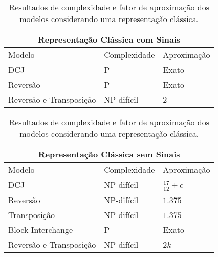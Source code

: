 \begin{table}[!htb]
  \caption{Resultados de complexidade e fator de aproximação dos modelos considerando uma representação clássica.}
  \label{table:XZPFGPAM}
  \centering
  \begin{tabular}{|p{8cm}|p{3cm}|p{3cm}|}
    \hline
    \multicolumn{3}{|c|}{Representação Clássica com Sinais}                                                                      \\ \hline
    Modelo                  & Complexidade                                 & Aproximação                                         \\ \hline
    DCJ                     & P~\cite{2005-yancopoulos-etal}               & Exato~\cite{2005-yancopoulos-etal}                  \\ \hline
    Reversão                & P~\cite{1999-hannenhalli-pevzner}            & Exato~\cite{1999-hannenhalli-pevzner}               \\ \hline
    Reversão e Transposição & NP-difícil~\cite{2019b-oliveira-etal}        & $2$~\cite{1998-walter-etal}                         \\ \hline
  \end{tabular}

  \hfill \break

  \begin{tabular}{|p{8cm}|p{3cm}|p{3cm}|}
    \hline
    \multicolumn{3}{|c|}{Representação Clássica sem Sinais}                                                                      \\ \hline
    Modelo                  & Complexidade                                 & Aproximação                                         \\ \hline
    DCJ                     & NP-difícil~\cite{2013-chen}                  & $\frac{17}{12}+\epsilon$~\cite{2013-chen}           \\ \hline
    Reversão                & NP-difícil~\cite{1999-caprara}               & $1.375$~\cite{2002-berman-etal}                     \\ \hline
    Transposição            & NP-difícil~\cite{2012-bulteau-etal}          & $1.375$~\cite{2006-elias-hartman,2022-silva-etal}   \\ \hline
    Block-Interchange       & P~\cite{1996-christie}                       & Exato~\cite{1996-christie}                          \\ \hline
    Reversão e Transposição & NP-difícil~\cite{2019b-oliveira-etal}        & $2k$~\cite{2008-rahman-etal,2013-chen}              \\ \hline
  \end{tabular}
\end{table}